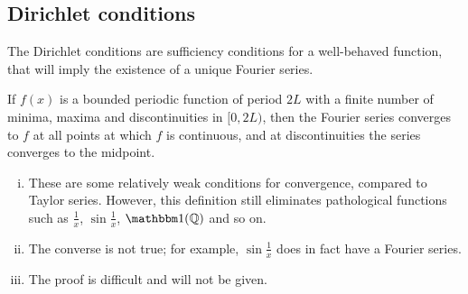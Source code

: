 \subsection{Dirichlet conditions}
The Dirichlet conditions are sufficiency conditions for a well-behaved function, that will imply the existence of a unique Fourier series.
\begin{theorem}
	If \( f(x) \) is a bounded periodic function of period \( 2L \) with a finite number of minima, maxima and discontinuities in \( [0, 2L) \), then the Fourier series converges to \( f \) at all points at which \( f \) is continuous, and at discontinuities the series converges to the midpoint.
\end{theorem}
\begin{remark}
	\begin{enumerate}[(i)]
		\item These are some relatively weak conditions for convergence, compared to Taylor series.
		      However, this definition still eliminates pathological functions such as \( \frac{1}{x} \), \( \sin \frac{1}{x} \), \( \mathbbm 1 (\mathbb Q) \) and so on.
		\item The converse is not true; for example, \( \sin \frac{1}{x} \) does in fact have a Fourier series.
		\item The proof is difficult and will not be given.
	\end{enumerate}
\end{remark}

